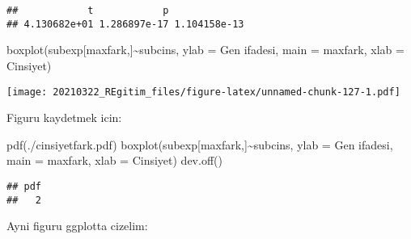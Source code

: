 \documentclass[
]{book}
\newenvironment{Shaded}{\begin{snugshade}}{\end{snugshade}}
\newcommand{\AttributeTok}[1]{\textcolor[rgb]{0.77,0.63,0.00}{#1}}
\newcommand{\FunctionTok}[1]{\textcolor[rgb]{0.00,0.00,0.00}{#1}}
\newcommand{\NormalTok}[1]{#1}
\newcommand{\SpecialCharTok}[1]{\textcolor[rgb]{0.00,0.00,0.00}{#1}}
\newcommand{\StringTok}[1]{\textcolor[rgb]{0.31,0.60,0.02}{#1}}
\begin{document}
\begin{verbatim}
##            t            p              
## 4.130682e+01 1.286897e-17 1.104158e-13
\end{verbatim}

\begin{Shaded}
\begin{Highlighting}[]
\FunctionTok{boxplot}\NormalTok{(subexp[maxfark,]}\SpecialCharTok{\textasciitilde{}}\NormalTok{subcins, }\AttributeTok{ylab =} \StringTok{\textquotesingle{}Gen ifadesi\textquotesingle{}}\NormalTok{, }\AttributeTok{main =}\NormalTok{ maxfark, }
        \AttributeTok{xlab =} \StringTok{\textquotesingle{}Cinsiyet\textquotesingle{}}\NormalTok{)}
\end{Highlighting}
\end{Shaded}

\texttt{[image: 20210322\_REgitim\_files/figure-latex/unnamed-chunk-127-1.pdf]}

Figuru kaydetmek icin:

\begin{Shaded}
\begin{Highlighting}[]
\FunctionTok{pdf}\NormalTok{(}\StringTok{\textquotesingle{}./cinsiyetfark.pdf\textquotesingle{}}\NormalTok{)}
\FunctionTok{boxplot}\NormalTok{(subexp[maxfark,]}\SpecialCharTok{\textasciitilde{}}\NormalTok{subcins, }\AttributeTok{ylab =} \StringTok{\textquotesingle{}Gen ifadesi\textquotesingle{}}\NormalTok{, }\AttributeTok{main =}\NormalTok{ maxfark, }
        \AttributeTok{xlab =} \StringTok{\textquotesingle{}Cinsiyet\textquotesingle{}}\NormalTok{)}
\FunctionTok{dev.off}\NormalTok{()}
\end{Highlighting}
\end{Shaded}

\begin{verbatim}
## pdf 
##   2
\end{verbatim}

Ayni figuru ggplotta cizelim:
\end{document}
